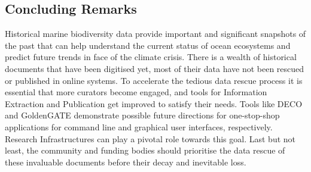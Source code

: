    \subsection{Concluding Remarks}
   Historical marine biodiversity data provide important and significant
snapshots of the past that can help understand the current status of ocean
ecosystems and predict future trends in face of the climate crisis. There is a
wealth of historical documents that have been digitised yet, most of their data
have not been rescued or published in online systems. To accelerate the tedious
data rescue process it is essential that more curators become engaged, and
tools for Information Extraction and Publication get improved to satisfy their
needs. Tools like DECO and GoldenGATE demonstrate possible future directions
for one-stop-shop applications for command line and graphical user interfaces,
respectively. Research Infrastructures can play a pivotal role towards this
goal. Last but not least, the community and funding bodies should prioritise
the data rescue of these invaluable documents before their decay and inevitable
loss.
